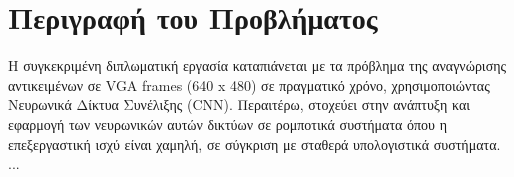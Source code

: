 \section{Περιγραφή του Προβλήματος}
\label{section:problem_description}

H συγκεκριμένη διπλωματική εργασία
καταπιάνεται με τα πρόβλημα της αναγνώρισης αντικειμένων σε VGA frames (640 x 480)
σε πραγματικό χρόνο, χρησιμοποιώντας Νευρωνικά Δίκτυα Συνέλιξης (CNN).
Περαιτέρω, στοχεύει στην ανάπτυξη και εφαρμογή των νευρωνικών αυτών δικτύων
σε ρομποτικά συστήματα όπου η επεξεργαστική ισχύ είναι χαμηλή, σε σύγκριση με
σταθερά υπολογιστικά συστήματα.
...


